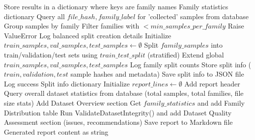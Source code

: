 \begin{algorithm}[!htbp]
\begin{algorithmic}[1]
    \State Store results in a dictionary where keys are family names
    \Return Family statistics dictionary
\EndFunction
\Statex
{}
    \State Query all $file\_hash, family\_label$ for 'collected' samples from database
    \State Group samples by family
    \State Filter families with $< min\_samples\_per\_family$
     \State Raise ValueError \EndIf
    \State Log balanced split creation details
    \State Initialize $train\_samples, val\_samples, test\_samples \leftarrow \emptyset$
        \State Split $family\_samples$ into train/validation/test sets using $train\_test\_split$ (stratified)
        \State Extend global $train\_samples, val\_samples, test\_samples$
        \State Log family split counts
    \EndFor
    \State Store split info ($train, validation, test$ sample hashes and metadata)
    \State Save split info to JSON file
    \State Log success
    \Return Split info dictionary
\EndProcedure
\Statex
{}
    \State Initialize $report\_lines \leftarrow \emptyset$
    \State Add report header
    \State Query overall dataset statistics from database (total samples, total families, file size stats)
    \State Add Dataset Overview section
    \State Get $family\_statistics$ and add Family Distribution table
    \State Run ValidateDatasetIntegrity() and add Dataset Quality Assessment section (issues, recommendations)
    \State Save report to Markdown file
    \Return Generated report content as string
\EndFunction
\end{algorithmic}
\end{algorithm}
